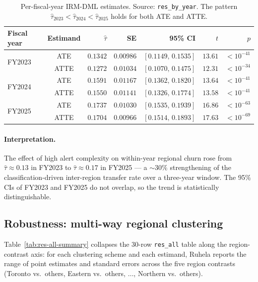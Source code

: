 \documentclass[11pt,a4paper]{article}
\newcommand{\1}{\mathbf{1}}
\theoremstyle{plain}
\theoremstyle{definition}
\begin{document}
\begin{table}[h]
\centering\small
\caption{Per-fiscal-year IRM-DML estimates.  Source: \texttt{res\_by\_year}.
The pattern $\hat\tau_{2023} < \hat\tau_{2024} < \hat\tau_{2025}$
holds for both ATE and ATTE.}\label{tab:res-by-year}
\begin{tabular}{lcrrrrr}
\toprule
Fiscal year & Estimand & $\widehat\tau$ & SE & 95\% CI & $t$ & $p$\\\midrule
\multirow{2}{*}{FY2023} & ATE  & $0.1342$ & $0.00986$ & $[0.1149,\,0.1535]$ & $13.61$ & $<10^{-41}$\\
                        & ATTE & $0.1272$ & $0.01034$ & $[0.1070,\,0.1475]$ & $12.31$ & $<10^{-34}$\\\midrule
\multirow{2}{*}{FY2024} & ATE  & $0.1591$ & $0.01167$ & $[0.1362,\,0.1820]$ & $13.64$ & $<10^{-41}$\\
                        & ATTE & $0.1550$ & $0.01141$ & $[0.1326,\,0.1774]$ & $13.58$ & $<10^{-41}$\\\midrule
\multirow{2}{*}{FY2025} & ATE  & $\mathbf{0.1737}$ & $0.01030$ & $[0.1535,\,0.1939]$ & $16.86$ & $<10^{-63}$\\
                        & ATTE & $\mathbf{0.1704}$ & $0.00966$ & $[0.1514,\,0.1893]$ & $17.63$ & $<10^{-69}$\\
\bottomrule
\end{tabular}
\end{table}

\paragraph{Interpretation.}  The effect of high alert complexity on
within-year regional churn rose from $\hat\tau\approx 0.13$ in
FY2023 to $\hat\tau\approx 0.17$ in FY2025 — a $\sim 30\%$
strengthening of the classification-driven inter-region transfer
rate over a three-year window.  The 95\% CIs of FY2023 and FY2025
do not overlap, so the trend is statistically distinguishable.

\subsection{Robustness: multi-way regional clustering}\label{sec:multiway}

Table~\ref{tab:res-all-summary} collapses the 30-row \texttt{res\_all}
table along the region-contrast axis: for each clustering scheme and
each estimand, Ruhela reports the range of point estimates and
standard errors across the five region contrasts (Toronto vs.\
others, Eastern vs.\ others, $\dots$, Northern vs.\ others).
\end{document}
